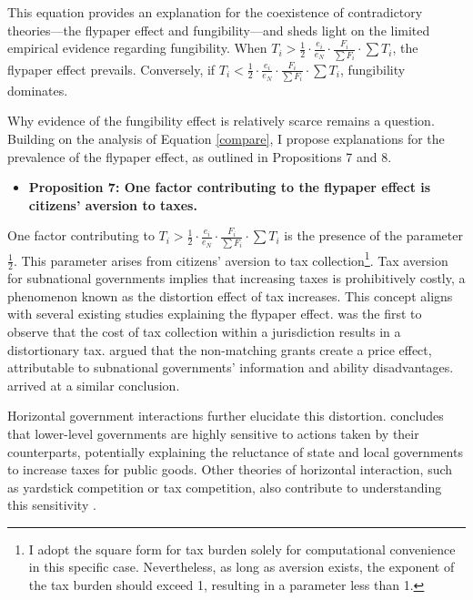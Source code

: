This equation provides an explanation for the coexistence of contradictory theories—the flypaper effect and fungibility—and sheds light on the limited empirical evidence regarding fungibility. When $T_i>\frac{1}{2}\cdot \frac{e_i}{e_N}\cdot \frac{F_i}{\sum F_i} \cdot \sum T_i$, the flypaper effect prevails. Conversely, if $T_i<\frac{1}{2}\cdot \frac{e_i}{e_N}\cdot \frac{F_i}{\sum F_i} \cdot \sum T_i$, fungibility dominates.

Why evidence of the fungibility effect is relatively scarce remains a question. Building on the analysis of Equation \ref{compare}, I propose explanations for the prevalence of the flypaper effect, as outlined in Propositions 7 and 8.

\begin {itemize}
\item \textbf{Proposition 7: One factor contributing to the flypaper effect is citizens' aversion to taxes.}
\end{itemize}

One factor contributing to $T_i>\frac{1}{2}\cdot \frac{e_i}{e_N}\cdot \frac{F_i}{\sum F_i} \cdot \sum T_i$ is the presence of the parameter $\frac{1}{2}$. This parameter arises from citizens' aversion to tax collection\footnote{I adopt the square form for tax burden solely for computational convenience in this specific case. Nevertheless, as long as aversion exists, the exponent of the tax burden should exceed 1, resulting in a parameter less than 1.}. Tax aversion for subnational governments implies that increasing taxes is prohibitively costly, a phenomenon known as the distortion effect of tax increases. This concept aligns with several existing studies explaining the flypaper effect. \Textcite{hamilton1986flypaper} was the first to observe that the cost of tax collection within a jurisdiction results in a distortionary tax. \Textcite{dahlby2016stimulative} argued that the non-matching grants create a price effect, attributable to subnational governments' information and ability disadvantages. \Textcite{vegh2016unsticking} arrived at a similar conclusion.%

Horizontal government interactions further elucidate this distortion. \Textcite{brueckner2003strategic} concludes that lower-level governments are highly sensitive to actions taken by their counterparts, potentially explaining the reluctance of state and local governments to increase taxes for public goods. Other theories of horizontal interaction, such as yardstick competition or tax competition, also contribute to understanding this sensitivity \parencite{shleifer1985theory,revelli2006performance}.%


